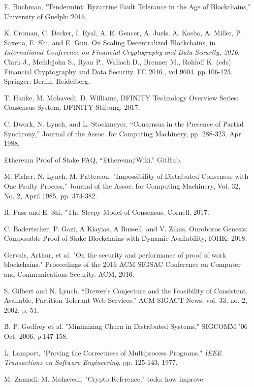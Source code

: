 \documentclass[10pt,journal,compsoc]{IEEEtran}
\begin{document}
\begin{thebibliography}{1}
 E. Buchman, "Tendermint: Byzantine Fault Tolerance in the Age of Blockchains," University of Guelph: 2016.

 K. Croman, C. Decker, I. Eyal, A. E. Gencer, A. Juels, A. Kosba, A. Miller, P. Saxena, E. Shi, and E. Gun. On Scaling Decentralized Blockchains, in \emph{International Conference on Financial Cryptography and Data Security, 2016}, Clark J., Meiklejohn S., Ryan P., Wallach D., Brenner M., Rohloff K. (eds) Financial Cryptography and Data Security. FC 2016., vol 9604. pp 106-125. Springer: Berlin, Heidelberg.

  T. Hanke, M. Mohavedi, D. Williams, DFINITY Technology Overview Series: Consensus System, DFINITY Stiftung, 2017.

C. Dwork, N. Lynch, and L. Stockmeyer, “Consensus in the Presence of Partial Synchrony,” Journal of the Assoc. for Computing Machinery, pp. 288-323, Apr. 1988.

 Ethereum Proof of Stake FAQ, “Ethereum/Wiki.” GitHub.

 M. Fisher, N. Lynch, M. Patterson. "Impossibility of Distributed Consensus with One Faulty Process," Journal of the Assoc. for Computing Machinery, Vol. 32, No. 2, April 1985, pp. 374-382.

R. Pass and E. Shi, "The Sleepy Model of Consensus. Cornell, 2017.

 C. Badertscher, P. Gazi, A Kiayias, A Russell, and V. Zikas, Ouroboros Genesis: Composable Proof-of-Stake Blockchains with Dynamic Availability, IOHK: 2018.

 Gervais, Arthur, et al. "On the security and performance of proof of work blockchains." Proceedings of the 2016 ACM SIGSAC Conference on Computer and Communications Security. ACM, 2016.

 S. Gilbert and N. Lynch. “Brewer's Conjecture and the Feasibility of Consistent, Available, Partition-Tolerant Web Services.” ACM SIGACT News, vol. 33, no. 2, 2002, p. 51.

 B. P. Godfrey et al. "Minimizing Churn in Distributed Systems." SIGCOMM '06 Oct. 2006, p.147-158.

 L. Lamport, "Proving the Correctness of Multiprocess Programs," \emph{IEEE Transactions on Software Engineering}, pp. 125-143, 1977.

 M. Zamadi, M. Mohavedi, "Crypto Reference." todo: how improve


\end{thebibliography}
\end{document}
